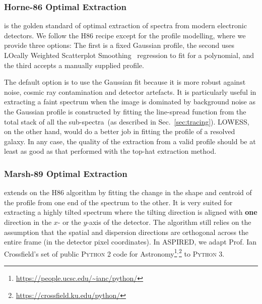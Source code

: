 \documentclass[linenumbers, twocolumn]{aastex631}
\begin{document}
\subsubsection*{Horne-86 Optimal Extraction}
\citet[hereafter H86]{1986PASP...98..609H} is the golden standard
of optimal extraction of spectra from modern electronic detectors.
We follow the H86 recipe except for the profile modelling,
where we provide three options: The first is a fixed Gaussian
profile, the second uses LOcally Weighted Scatterplot
Smoothing~\citep[LOWESS]{doi:10.1080/01621459.1979.10481038}
regression to fit for a polynomial, and the third accepts
a manually supplied profile.

The default option is to use the Gaussian fit because it is
more robust against noise, cosmic ray contamination and detector
artefacts. It is particularly useful in extracting a faint
spectrum when the image is dominated by background noise as the
Gaussian profile is constructed by fitting the line-spread
function from the total stack of all the
sub-spectra~(as described in Sec.~\ref{sec:tracing}).
LOWESS, on the other hand, would do a better job in fitting
the profile of a resolved galaxy. In any case, the quality
of the extraction from a valid profile should be at least as
good as that performed with the top-hat extraction method.

\subsubsection*{Marsh-89 Optimal Extraction}
\citet[hereafter M89]{1989PASP..101.1032M} extends on the H86 algorithm by
fitting the change in the shape and centroid of the profile from one end of the
spectrum to the other. It is very suited for extracting a highly tilted
spectrum where the tilting direction is aligned with \textbf{one} direction in
the $x$- or the $y$-axis of the detector. The algorithm still relies on the
assumption that the spatial and dispersion directions are orthogonal across
the entire frame (in the detector pixel coordinates). In \textsc{ASPIRED}, we
adapt Prof. Ian Crossfield's set of public \textsc{Python 2} code for
Astronomy\footnote{\url{https://people.ucsc.edu/~ianc/python/}}$^,$\footnote{\url{https://crossfield.ku.edu/python/}}
to \textsc{Python 3}.
\end{document}
